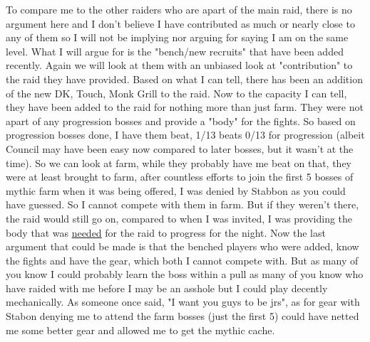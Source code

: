\documentclass[9pt,letterpaper]{article}
\begin{document}
To compare me to the other raiders who are apart of the main raid, there is no argument here and I don't believe I have contributed as much or nearly close to any of them so I will not be implying nor arguing for saying I am on the same level. What I will argue for is the "bench/new recruits" that have been added recently. Again we will look at them with an unbiased look at "contribution" to the raid they have provided. Based on what I can tell, there has been an addition of the new DK, Touch, Monk Grill to the raid. Now to the capacity I can tell, they have been added to the raid for nothing more than just farm. They were not apart of any progression bosses and provide a "body" for the fights. So based on progression bosses done, I have them beat, 1/13 beats 0/13 for progression (albeit Council may have been easy now compared to later bosses, but it wasn't at the time). So we can look at farm, while they probably have me beat on that, they were at least brought to farm, after countless efforts to join the first 5 bosses of mythic farm when it was being offered, I was denied by Stabbon as you could have guessed. So I cannot compete with them in farm. But if they weren't there, the raid would still go on, compared to when I was invited, I was providing the body that was \underline{needed} for the raid to progress for the night. Now the last argument that could be made is that the benched players who were added, know the fights and have the gear, which both I cannot compete with. But as many of you know I could probably learn the boss within a pull as many of you know who have raided with me before I may be an asshole but I could play decently mechanically. As someone once said, "I want you guys to be jrs", as for gear with Stabon denying me to attend the farm bosses (just the first 5) could have netted me some better gear and allowed me to get the mythic cache.\vspace{0.5cm}
\end{document}
